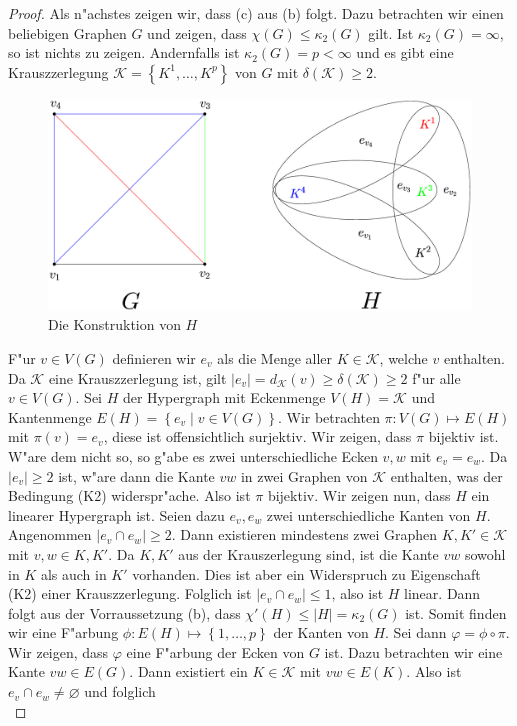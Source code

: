 \begin{proof}
Als n"achstes zeigen wir, dass (c) aus (b) folgt. 
  Dazu betrachten wir einen beliebigen Graphen $G$ und zeigen, dass $\chi(G) \leq \kappa_{2}(G)$ gilt. Ist $\kappa_{2}(G) = \infty$, so ist nichts zu zeigen. Andernfalls ist $\kappa_{2}(G) = p < \infty $ und es gibt eine Krauszzerlegung $\mathcal{K}= \left\{ K^{1},\dots,K^{p} \right\}$ von $G$ mit $\delta(\mathcal{K}) \geq 2 $.  
\begin{figure}[h]
  \centering
  \includegraphics[width=\textwidth]{images/k4krausztohypergraph.eps}
  \caption{Die Konstruktion von $H$}
  \label{fig:konstruktionH}
\end{figure}
  F"ur $v\in V(G)$ definieren wir $e_v$ als die Menge aller $K\in \mathcal{K}$, welche $v$ enthalten. Da $\mathcal{K}$ eine Krauszzerlegung ist, gilt $|e_v| = d_{\mathcal{K}}(v)\geq \delta(\mathcal{K}) \geq 2$ f"ur alle $v \in V(G)$. Sei $H$ der Hypergraph mit Eckenmenge $V(H) = \mathcal{K}$ und Kantenmenge $E(H) = \left\{ e_v\;|\; v\in V(G) \right\}$. Wir betrachten $\pi: V(G) \mapsto E(H)$ mit $\pi(v) = e_v$, diese ist offensichtlich surjektiv. Wir zeigen, dass $\pi$ bijektiv ist. W"are dem nicht so, so g"abe es zwei unterschiedliche Ecken $v,w$ mit $e_v = e_w$. 
  Da $|e_v| \geq 2$ ist,  w"are dann die Kante $vw$ in zwei Graphen von $\mathcal{K}$ enthalten, was der Bedingung (K2) widerspr"ache. Also ist $\pi$ bijektiv.
  Wir zeigen nun, dass $H$ ein linearer Hypergraph ist. 
  Seien dazu $e_{v},e_{w} $ zwei unterschiedliche Kanten von $H$.
  Angenommen $|e_{v}\cap e_{w}| \geq 2$. Dann existieren mindestens zwei Graphen $K,K' \in \mathcal{K}$ mit $v,w \in K,K'$. Da $K,K'$ aus der Krauszerlegung sind, ist die Kante $vw$ sowohl in $K$ als auch in $K'$ vorhanden. Dies ist aber ein Widerspruch zu Eigenschaft (K2) einer Krauszzerlegung.
  Folglich ist $|e_{v}\cap e_{w}| \leq 1$, also ist $H$ linear. Dann folgt aus der Vorraussetzung (b), dass $\chi'(H) \leq |H| = \kappa_{2}(G)$ ist.
  Somit finden wir eine F"arbung $\phi : E(H) \mapsto \left\{ 1,\dots,p \right\}$ der Kanten von $H$. Sei dann $\varphi =  \phi \circ \pi$. Wir zeigen, dass $\varphi$ eine F"arbung der Ecken von $G$ ist. Dazu betrachten wir eine Kante $vw\in E(G)$. Dann existiert ein $K\in \mathcal{K}$ mit $vw\in E(K)$. Also ist $e_v\cap e_w \neq \varnothing$ und folglich \begin{equation*}

\end{equation*}
\end{proof}
